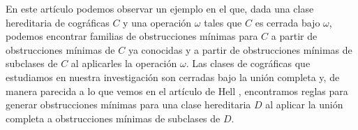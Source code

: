 En este artículo podemos observar un ejemplo en el que, dada una clase hereditaria de cográficas $C$ y una operación $\omega$ tales que $C$ es cerrada bajo $\omega$, podemos encontrar familias de obstrucciones mínimas para $C$ a partir de obstrucciones mínimas de $C$ ya conocidas y a partir de obstrucciones mínimas de subclases de $C$ al aplicarles la operación $\omega$. Las clases de cográficas que estudiamos en nuestra investigación son cerradas bajo la unión completa y, de manera parecida a lo que vemos en el artículo de Hell \cite{Hell03}, encontramos reglas para generar obstrucciones mínimas para una clase hereditaria $D$ al aplicar la unión completa a obstrucciones mínimas de subclases de $D$.
